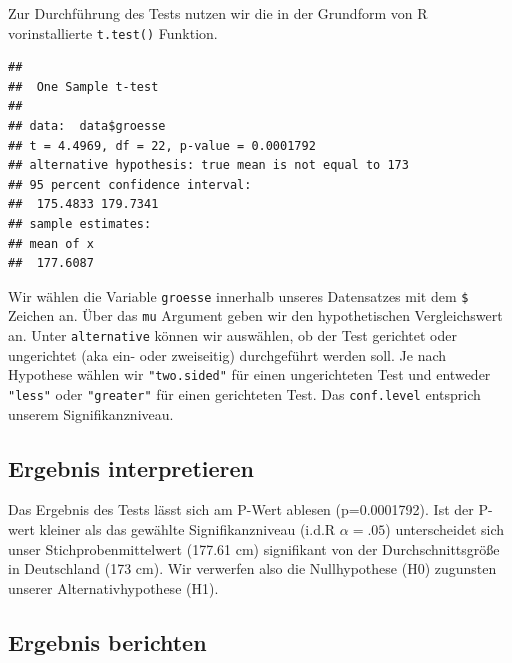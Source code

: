 \documentclass[
]{book}
\newenvironment{Shaded}{\begin{snugshade}}{\end{snugshade}}
\newcommand{\AttributeTok}[1]{\textcolor[rgb]{0.77,0.63,0.00}{#1}}
\newcommand{\DecValTok}[1]{\textcolor[rgb]{0.00,0.00,0.81}{#1}}
\newcommand{\FloatTok}[1]{\textcolor[rgb]{0.00,0.00,0.81}{#1}}
\newcommand{\FunctionTok}[1]{\textcolor[rgb]{0.00,0.00,0.00}{#1}}
\newcommand{\NormalTok}[1]{#1}
\newcommand{\SpecialCharTok}[1]{\textcolor[rgb]{0.00,0.00,0.00}{#1}}
\newcommand{\StringTok}[1]{\textcolor[rgb]{0.31,0.60,0.02}{#1}}
\begin{document}
Zur Durchführung des Tests nutzen wir die in der Grundform von R vorinstallierte \texttt{t.test()} Funktion.

\begin{Shaded}
\end{Shaded}

\begin{verbatim}
## 
##  One Sample t-test
## 
## data:  data$groesse
## t = 4.4969, df = 22, p-value = 0.0001792
## alternative hypothesis: true mean is not equal to 173
## 95 percent confidence interval:
##  175.4833 179.7341
## sample estimates:
## mean of x 
##  177.6087
\end{verbatim}

Wir wählen die Variable \texttt{groesse} innerhalb unseres Datensatzes mit dem \texttt{\$} Zeichen an. Über das \texttt{mu} Argument geben wir den hypothetischen Vergleichswert an. Unter \texttt{alternative} können wir auswählen, ob der Test gerichtet oder ungerichtet (aka ein- oder zweiseitig) durchgeführt werden soll. Je nach Hypothese wählen wir \texttt{"two.sided"} für einen ungerichteten Test und entweder \texttt{"less"} oder \texttt{"greater"} für einen gerichteten Test. Das \texttt{conf.level} entsprich unserem Signifikanzniveau.

\hypertarget{ergebnis-interpretieren}{%
\subsection{Ergebnis interpretieren}\label{ergebnis-interpretieren}}

Das Ergebnis des Tests lässt sich am P-Wert ablesen (p=0.0001792). Ist der P-wert kleiner als das gewählte Signifikanzniveau (i.d.R \(\alpha=.05\)) unterscheidet sich unser Stichprobenmittelwert (177.61 cm) signifikant von der Durchschnittsgröße in Deutschland (173 cm). Wir verwerfen also die Nullhypothese (H0) zugunsten unserer Alternativhypothese (H1).

\hypertarget{ergebnis-berichten}{%
\subsection{Ergebnis berichten}\label{ergebnis-berichten}}
\end{document}
